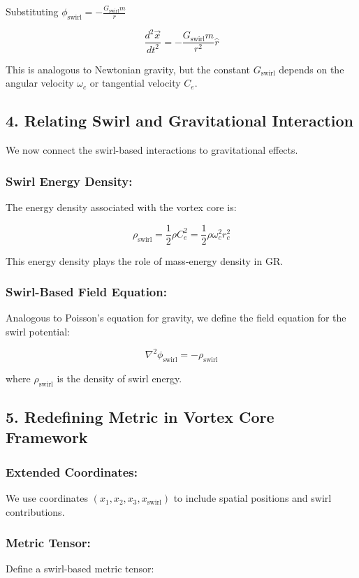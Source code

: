{Substituting \(\phi_\text{swirl} = -\frac{G_\text{swirl} m}{r}\)

\[\frac{d^2 \vec{x}}{dt^2} = -\frac{G_\text{swirl} m}{r^2} \hat{r}\]

This is analogous to Newtonian gravity, but the constant \(G_\text{swirl}\) depends on the angular velocity \(\omega_c\) or tangential velocity \(C_e\).

\subsection*{4. Relating Swirl and Gravitational Interaction}
We now connect the swirl-based interactions to gravitational effects.

\subsubsection*{Swirl Energy Density:}
The energy density associated with the vortex core is:

\[\rho_\text{swirl} = \frac{1}{2} \rho C_e^2 = \frac{1}{2} \rho \omega_c^2 r_c^2\]

This energy density plays the role of mass-energy density in GR.

\subsubsection*{Swirl-Based Field Equation:}
Analogous to Poisson’s equation for gravity, we define the field equation for the swirl potential:

\[\nabla^2 \phi_\text{swirl} = -\rho_\text{swirl}\]

where \(\rho_\text{swirl}\) is the density of swirl energy.

\subsection*{5. Redefining Metric in Vortex Core Framework}
\subsubsection*{Extended Coordinates:}
We use coordinates \((x_1, x_2, x_3, x_\text{swirl})\) to include spatial positions and swirl contributions.

\subsubsection*{Metric Tensor:}
Define a swirl-based metric tensor:

}
